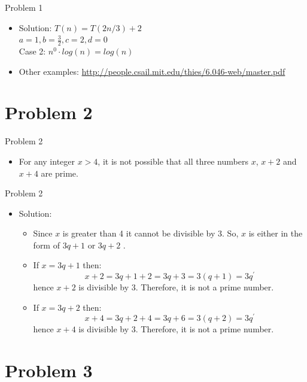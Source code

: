 \documentclass{beamer}
\begin{document}
\begin{frame}{Problem 1}
   \begin{itemize}
        \item Solution:
            $T(n) = T(2n/3) + 2$
            \\ $a = 1, b = \frac{3}{2}, c = 2, d = 0$
            \\ Case 2: $n^0 \cdot log(n) = log(n)$
       \item Other examples: \url{http://people.csail.mit.edu/thies/6.046-web/master.pdf}      
    \end{itemize}
\end{frame}

\section{Problem 2}

\begin{frame}{Problem 2}
   \begin{itemize}
          \item  For any integer $x>4$, it is not possible that all three numbers $x$, $x + 2$ and $x + 4$ are prime.
      \end{itemize}
\end{frame}

\begin{frame}{Problem 2}
   \begin{itemize}
        \item  Solution:
        \begin{itemize}
            \item Since $x$ is greater than 4 it cannot be divisible by 3. So, $x$ is either in the form of $3q + 1$ or $3q + 2$ .
            \item If $x = 3q + 1$ then: $$x + 2 = 3q + 1 + 2 = 3q + 3 = 3(q + 1) = 3q^{'}$$ hence $x + 2$ is divisible by 3. Therefore, it is not a prime number.
            \item If $x = 3q + 2$ then: $$x + 4 = 3q + 2 + 4 = 3q + 6 = 3(q + 2) = 3q^{'}$$ hence $x + 4$ is divisible by 3. Therefore, it is not a prime number.
        \end{itemize}
    \end{itemize}
\end{frame}

\section{Problem 3}
\end{document}
